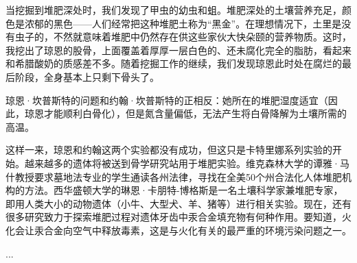 \documentclass[12pt,oneside]{book}
\begin{document}
\begin{bookref}[frametitle={\cite{好好告别}}]
当挖掘到堆肥深处时，我们发现了甲虫的幼虫和蛆。堆肥深处的土壤营养充足，颜色是浓郁的黑色——人们经常把这种堆肥土称为“黑金”。在理想情况下，土里是没有虫子的，不然就意味着堆肥中仍然存在供这些家伙大快朵颐的营养物质。这时，我挖出了琼恩的股骨，上面覆盖着厚厚一层白色的、还未腐化完全的脂肪，看起来和希腊酸奶的质感差不多。随着挖掘工作的继续，我们发现琼恩此时处在腐烂的最后阶段，全身基本上只剩下骨头了。

琼恩·坎普斯特的问题和约翰·坎普斯特的正相反：她所在的堆肥湿度适宜（因此，琼恩才能顺利白骨化），但是氮含量偏低，无法产生将白骨降解为土壤所需的高温。

这样一来，琼恩和约翰这两个实验都没有成功，但这只是卡特里娜系列实验的开始。越来越多的遗体将被送到骨学研究站用于堆肥实验。维克森林大学的谭雅·马什教授要求墓地法专业的学生通读各州法律，寻找在全美50个州合法化人体堆肥机构的方法。西华盛顿大学的琳恩·卡朋特-博格斯是一名土壤科学家兼堆肥专家，即用人类大小的动物遗体（小牛、大型犬、羊、猪等）进行相关实验。现在，还有很多研究致力于探索堆肥过程对遗体牙齿中汞合金填充物有何种作用。要知道，火化会让汞合金向空气中释放毒素，这是与火化有关的最严重的环境污染问题之一。

...

\end{bookref}
\end{document}
